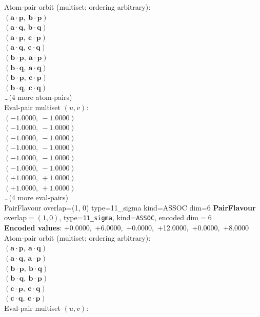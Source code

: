 \documentclass[a4paper,11pt]{article}
\newcommand{\pdcegfomjfhook}[2]{\mathbf{#1} \cdot \mathbf{#2}}
\begin{document}
\quad Atom-pair orbit (multiset; ordering arbitrary):\\
$(\pdcegfomjfhook{a}{p},\ \pdcegfomjfhook{b}{p})$\\
$(\pdcegfomjfhook{a}{q},\ \pdcegfomjfhook{b}{q})$\\
$(\pdcegfomjfhook{a}{p},\ \pdcegfomjfhook{c}{p})$\\
$(\pdcegfomjfhook{a}{q},\ \pdcegfomjfhook{c}{q})$\\
$(\pdcegfomjfhook{b}{p},\ \pdcegfomjfhook{a}{p})$\\
$(\pdcegfomjfhook{b}{q},\ \pdcegfomjfhook{a}{q})$\\
$(\pdcegfomjfhook{b}{p},\ \pdcegfomjfhook{c}{p})$\\
$(\pdcegfomjfhook{b}{q},\ \pdcegfomjfhook{c}{q})$\\
\quad \ldots (4 more atom-pairs)\\
\quad Eval-pair multiset $(u, v)$:\\
$(-1.0000,\ -1.0000)$\\
$(-1.0000,\ -1.0000)$\\
$(-1.0000,\ -1.0000)$\\
$(-1.0000,\ -1.0000)$\\
$(-1.0000,\ -1.0000)$\\
$(-1.0000,\ -1.0000)$\\
$(+1.0000,\ +1.0000)$\\
$(+1.0000,\ +1.0000)$\\
\quad \ldots (4 more eval-pairs)\\
    PairFlavour  overlap=(1, 0)  type=11\_sigma  kind=ASSOC  dim=6
\textbf{PairFlavour} overlap$=(1, 0)$, type=\texttt{11\_sigma}, kind=\texttt{ASSOC}, encoded dim$=6$\\
\textbf{      Encoded values}: +0.0000,\ +6.0000,\ +0.0000,\ +12.0000,\ +0.0000,\ +8.0000\\
\quad Atom-pair orbit (multiset; ordering arbitrary):\\
$(\pdcegfomjfhook{a}{p},\ \pdcegfomjfhook{a}{q})$\\
$(\pdcegfomjfhook{a}{q},\ \pdcegfomjfhook{a}{p})$\\
$(\pdcegfomjfhook{b}{p},\ \pdcegfomjfhook{b}{q})$\\
$(\pdcegfomjfhook{b}{q},\ \pdcegfomjfhook{b}{p})$\\
$(\pdcegfomjfhook{c}{p},\ \pdcegfomjfhook{c}{q})$\\
$(\pdcegfomjfhook{c}{q},\ \pdcegfomjfhook{c}{p})$\\
\quad Eval-pair multiset $(u, v)$:\\
\end{document}
